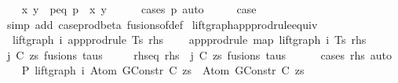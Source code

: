 \begin{isabellebody}
\ \ \isamarkupfalse%
\ x\ y\ \ p{\isacharunderscore}{\kern0pt}eq{\isacharcolon}{\kern0pt}\ {\isachardoublequoteopen}p\ {\isacharequal}{\kern0pt}\ {\isacharparenleft}{\kern0pt}x{\isacharcomma}{\kern0pt}\ y{\isacharparenright}{\kern0pt}{\isachardoublequoteclose}\isanewline
\ \ \ \ \isamarkupfalse%
\ {\isacharparenleft}{\kern0pt}cases\ p{\isacharparenright}{\kern0pt}\ auto\isanewline
\ \ \isamarkupfalse%
\ \isamarkupfalse%
\ {\isacharquery}{\kern0pt}case\isanewline
\ \ \ \ \isamarkupfalse%
\ {\isacharparenleft}{\kern0pt}simp\ add{\isacharcolon}{\kern0pt}\ case{\isacharunderscore}{\kern0pt}prod{\isacharunderscore}{\kern0pt}beta\ fusions{\isacharunderscore}{\kern0pt}of{\isacharunderscore}{\kern0pt}def{\isacharparenright}{\kern0pt}\isanewline
{}\isamarkupfalse%
%
\endisatagproof
{\isafoldproof}%
%
\isadelimproof
\isanewline
%
\endisadelimproof
\isanewline
\isanewline
{}\isamarkupfalse%
\ lift{\isacharunderscore}{\kern0pt}graph{\isacharunderscore}{\kern0pt}app{\isacharunderscore}{\kern0pt}prodrule{\isacharunderscore}{\kern0pt}equiv{\isacharcolon}{\kern0pt}\isanewline
\ \ {\isachardoublequoteopen}lift{\isacharunderscore}{\kern0pt}graph\ i\ {\isacharparenleft}{\kern0pt}app{\isacharunderscore}{\kern0pt}prodrule\ Ts\ rhs{\isacharparenright}{\kern0pt}\ {\isacharequal}{\kern0pt}\isanewline
\ \ \ app{\isacharunderscore}{\kern0pt}prodrule\ {\isacharparenleft}{\kern0pt}map\ {\isacharparenleft}{\kern0pt}lift{\isacharunderscore}{\kern0pt}graph\ i{\isacharparenright}{\kern0pt}\ Ts{\isacharparenright}{\kern0pt}\ rhs{\isachardoublequoteclose}\isanewline
%
\isadelimproof
%
\endisadelimproof
%
\isatagproof
{}\isamarkupfalse%
\ {\isacharminus}{\kern0pt}\isanewline
\ \ \isamarkupfalse%
\ j\ C\ zs\ fusions\ taus\isanewline
\ \ \ \ \ rhs{\isacharunderscore}{\kern0pt}eq{\isacharcolon}{\kern0pt}\ {\isachardoublequoteopen}rhs\ {\isacharequal}{\kern0pt}\ {\isacharparenleft}{\kern0pt}j{\isacharcomma}{\kern0pt}\ {\isacharparenleft}{\kern0pt}C{\isacharcomma}{\kern0pt}\ zs{\isacharparenright}{\kern0pt}{\isacharcomma}{\kern0pt}\ fusions{\isacharcomma}{\kern0pt}\ taus{\isacharparenright}{\kern0pt}{\isachardoublequoteclose}\isanewline
\ \ \ \ \isamarkupfalse%
\ {\isacharparenleft}{\kern0pt}cases\ rhs{\isacharparenright}{\kern0pt}\ auto\isanewline
\isanewline
\ \ \isamarkupfalse%
\ P{}{\isacharcolon}{\kern0pt}\ {\isachardoublequoteopen}lift{\isacharunderscore}{\kern0pt}graph\ i\ {\isacharparenleft}{\kern0pt}Atom\ {\isacharparenleft}{\kern0pt}GConstr\ C{\isacharparenright}{\kern0pt}\ zs{\isacharparenright}{\kern0pt}\ {\isacharequal}{\kern0pt}\ Atom\ {\isacharparenleft}{\kern0pt}GConstr\ C{\isacharparenright}{\kern0pt}\ zs{\isachardoublequoteclose}\isanewline

\end{isabellebody}
